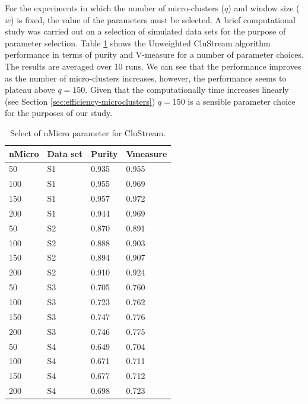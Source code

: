 For the experiments in which the number of micro-clusters ($q$) and window size ($w$) is fixed, the value of the parameters must be selected. A brief computational study was carried out on a selection of simulated data sets for the purpose of parameter selection. Table \ref{tab:parameters-unweighted} shows the Unweighted CluStream algorithm performance in terms of purity and V-measure for a number of parameter choices. The results are averaged over 10 runs. We can see that the performance improves as the number of micro-clusters increases, however, the performance seems to plateau above $q = 150$. Given that the computationally time increases linearly (see Section \ref{sec:efficiency-microclusters}) $q = 150$ is a sensible parameter choice for the purposes of our study.  

\begin{table}[!h]
\centering
\caption{Select of nMicro parameter for CluStream.}
\label{tab:parameters-unweighted}
\begin{tabular}{llll}
\hline
nMicro & Data set & Purity & Vmeasure \\ \hline
50   & S1      & 0.935  & 0.955    \\
100  & S1      & 0.955  & 0.969    \\
150  & S1      & 0.957  & 0.972    \\
200  & S1      & 0.944  & 0.969    \\ \hline
50   & S2      & 0.870  & 0.891    \\
100  & S2      & 0.888  & 0.903    \\
150  & S2      & 0.894  & 0.907    \\
200  & S2      & 0.910  & 0.924    \\ \hline
50   & S3      & 0.705  & 0.760    \\
100  & S3      & 0.723  & 0.762    \\
150  & S3      & 0.747  & 0.776    \\
200  & S3      & 0.746  & 0.775    \\ \hline
50   & S4      & 0.649  & 0.704    \\
100  & S4      & 0.671  & 0.711    \\
150  & S4      & 0.677  & 0.712    \\
200  & S4      & 0.698  & 0.723    \\ \hline
\end{tabular}
\end{table}

